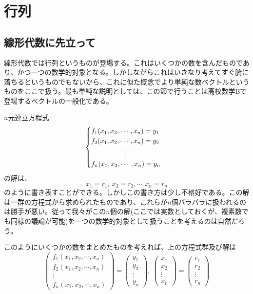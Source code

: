 \documentclass[dvipdfmx]{jsarticle}
\begin{document}
\section{行列}

\subsection{線形代数に先立って}
線形代数では行列というものが登場する。これはいくつかの数を含んだものであり、かつ一つの数学的対象となる。しかしながらこれはいきなり考えてすぐ腑に落ちるというものでもないから、これに似た概念でより単純な数ベクトルというものをここで扱う。最も単純な説明としては、この節で行うことは高校数学Bで登場するベクトルの一般化である。\\\par
\motiv $n$元連立方程式
\[\begin{cases}f_1(x_1,x_2,\cdots,x_n)=y_1\\f_2(x_1,x_2,\cdots,x_n)=y_2\\\hspace{17mm}\vdots\\f_n(x_1,x_2,\cdots,x_n)=y_n\end{cases}\]
の解は、
\[x_1=r_1,~x_2=r_2,\cdots,x_n=r_n\]
のように書き表すことができる。しかしこの書き方は少し不格好である。この解は一群の方程式から求められたものであり、これらが$n$個バラバラに扱われるのは勝手が悪い。従って我々がこの$n$個の解(ここでは実数としておくが、複素数でも同様の議論が可能)を一つの数学的対象として扱うことを考えるのは自然だろう。\par
このようにいくつかの数をまとめたものを考えれば、上の方程式群及び解は
\[\begin{pmatrix}f_1(x_1,x_2,\cdots,x_n)\\f_2(x_1,x_2,\cdots,x_n)\\\vdots\\f_n(x_1,x_2,\cdots,x_n)\end{pmatrix}=\begin{pmatrix}y_1\\y_2\\\vdots\\y_n\end{pmatrix},~\begin{pmatrix}x_1\\x_2\\\vdots\\x_n\end{pmatrix}=\begin{pmatrix}r_1\\r_2\\\vdots\\r_n\end{pmatrix}\]
\end{document}
